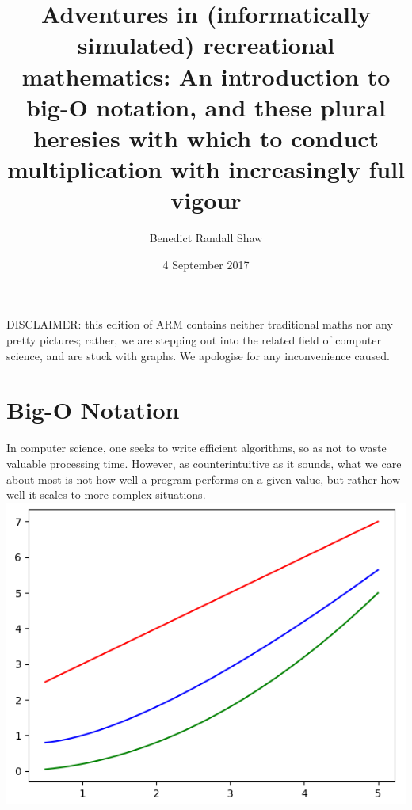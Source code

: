 \documentclass{article}
\begin{document}
\title{Adventures in (informatically simulated) recreational mathematics: An introduction to big-O notation, and these plural heresies with which to conduct multiplication with increasingly full vigour}
\date{4 September 2017}
\author{Benedict Randall Shaw}

\maketitle

DISCLAIMER: this edition of ARM contains neither traditional maths nor any pretty pictures; rather, we are stepping out into the related field of computer science, and are stuck with graphs. We apologise for any inconvenience caused.

\section{Big-O Notation}

In computer science, one seeks to write efficient algorithms, so as not to waste valuable processing time. However, as counterintuitive as it sounds, what we care about most is not how well a program performs on a given value, but rather how well it scales to more complex situations.\\

\includegraphics{smallgraph.png}
\end{document}
